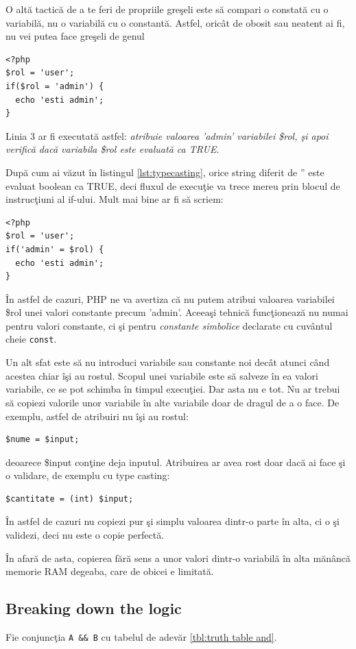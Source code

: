 O altă tactică de a te feri de propriile greşeli este să compari o constată
cu o variabilă, nu o variabilă cu o constantă. Astfel, oricât de obosit
sau neatent ai fi, nu vei putea face greşeli de genul
\begin{lstlisting}
<?php
$rol = 'user';
if($rol = 'admin') {
  echo 'esti admin';
}
\end{lstlisting}
Linia 3 ar fi executată astfel: \textit{atribuie valoarea 'admin' variabilei
\$rol, şi apoi verifică dacă variabila \$rol este evaluată ca TRUE}.

După cum ai văzut în listingul \ref{lst:typecasting}, orice string diferit
de '' este evaluat boolean ca TRUE, deci fluxul de execuţie va trece mereu
prin blocul de instrucţiuni al if-ului. Mult mai bine ar fi să scriem:
\begin{lstlisting}
<?php
$rol = 'user';
if('admin' = $rol) {
  echo 'esti admin';
}
\end{lstlisting}
În astfel de cazuri, PHP ne va avertiza că nu putem atribui valoarea variabilei
\$rol unei valori constante precum 'admin'. Aceeaşi tehnică funcţionează nu numai
pentru valori constante, ci şi pentru \textsl{constante simbolice} declarate cu cuvântul
cheie \texttt{const}.

Un alt sfat este să nu introduci variabile sau constante noi decât atunci când
acestea chiar îşi au rostul. Scopul unei variabile este să salveze în ea
valori variabile, ce se pot schimba în timpul execuţiei. Dar asta nu e tot.
Nu ar trebui să copiezi valorile unor variabile în alte variabile doar
de dragul de a o face. De exemplu, astfel de atribuiri nu îşi au rostul:
\begin{lstlisting}
$nume = $input;
\end{lstlisting}
deoarece \$input conţine deja inputul. Atribuirea ar avea rost doar dacă ai face
şi o validare, de exemplu cu type casting:
\begin{lstlisting}
$cantitate = (int) $input;
\end{lstlisting}
În astfel de cazuri nu copiezi pur şi simplu valoarea dintr-o parte în alta, ci
o şi validezi, deci nu este o {\glqq}copie perfectă{\grqq}.

În afară de asta, copierea fără sens a unor valori dintr-o variabilă în alta mănâncă
memorie RAM degeaba, care de obicei e limitată.

\subsection{Breaking down the logic}
Fie conjuncţia \texttt{A \&\& B} cu tabelul de adevăr \ref{tbl:truth table and}.

